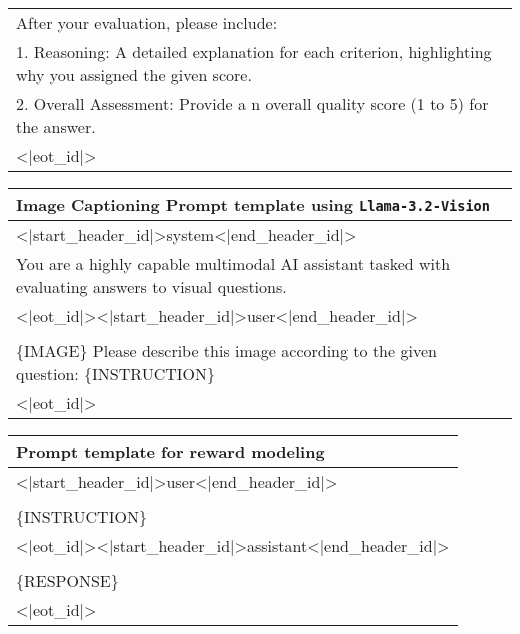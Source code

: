 \begin{table*}[hbtp]
\begin{center}
\begin{tabular}{|p{\textwidth}|}
            After your evaluation, please include: \\
            1. Reasoning: A detailed explanation for each criterion, highlighting why you assigned the given score. \\
            2. Overall Assessment: Provide a n overall quality score (1 to 5) for the answer. \\
            \textless$\vert$eot\_id$\vert$\textgreater \\
            \hline
        \end{tabular}
        \begin{tabular}{|p{\textwidth}|}
            \hline
            \textbf{Image Captioning Prompt template using \texttt{Llama-3.2-Vision}} \\
            \hline
            \textless$\vert$start\_header\_id$\vert$\textgreater system\textless$\vert$end\_header\_id$\vert$\textgreater \\
            You are a highly capable multimodal AI assistant tasked with evaluating answers to visual questions. \\
            \textless$\vert$eot\_id$\vert$\textgreater \textless$\vert$start\_header\_id$\vert$\textgreater user\textless$\vert$end\_header\_id$\vert$\textgreater \\ \\
            \{IMAGE\} Please describe this image according to the given question: \{INSTRUCTION\} \\
            \textless$\vert$eot\_id$\vert$\textgreater \\
            \hline
        \end{tabular}
        \begin{tabular}{|p{\textwidth}|}
            \hline
            \textbf{Prompt template for reward modeling} \\
            \hline
            \textless$\vert$start\_header\_id$\vert$\textgreater user\textless$\vert$end\_header\_id$\vert$\textgreater \\ \\
            \{INSTRUCTION\} \\
            \textless$\vert$eot\_id$\vert$\textgreater \textless$\vert$start\_header\_id$\vert$\textgreater assistant\textless$\vert$end\_header\_id$\vert$\textgreater \\ \\
            \{RESPONSE\} \\
            \textless$\vert$eot\_id$\vert$\textgreater \\
            \hline
        \end{tabular}
    \end{center}
    \caption{Prompt template for best-of-n sampling, image captioning and reward modeling.} 
    \label{tab:prompt_templates}
\end{table*}